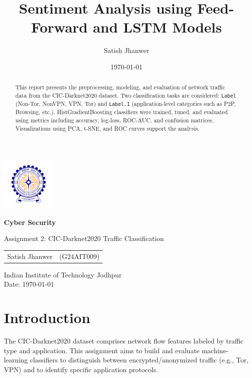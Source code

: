 \documentclass[12pt]{article}
\title{
  \Huge \textbf{Sentiment Analysis using Feed-Forward and LSTM Models}
}
\author[1]{Satish Jhanwer}
\affil[1]{Roll No: G24AIT009}
\date{\today}
\begin{document}
\justifying

\begin{titlepage}
  \centering
  \includegraphics[width=0.2\textwidth]{images/logo.png}\par\vspace{1cm}

  {\Huge \bfseries Cyber Security \par}
  \vspace{0.5cm}
  {\Large Assignment 2: CIC-Darknet2020 Traffic Classification \par}
  \vspace{1cm}

  \begin{tabular}{rl}
    Satish Jhanwer & (G24AIT009) \\
  \end{tabular}

  \vfill

  Indian Institute of Technology Jodhpur \\
  \vspace{0.5cm}
  Date: \today

\end{titlepage}

\newpage

\begin{abstract}
  This report presents the preprocessing, modeling, and evaluation of network traffic data from the CIC-Darknet2020 dataset. Two classification tasks are considered: \texttt{Label} (Non-Tor, NonVPN, VPN, Tor) and \texttt{Label.1} (application-level categories such as P2P, Browsing, etc.). HistGradientBoosting classifiers were trained, tuned, and evaluated using metrics including accuracy, log-loss, ROC-AUC, and confusion matrices. Visualizations using PCA, t-SNE, and ROC curves support the analysis.
\end{abstract}

\newpage

\tableofcontents
\listoffigures

\newpage

\section{Introduction}
The CIC-Darknet2020 dataset comprises network flow features labeled by traffic type and application. This assignment aims to build and evaluate machine-learning classifiers to distinguish between encrypted/anonymized traffic (e.g., Tor, VPN) and to identify specific application protocols.
\end{document}
